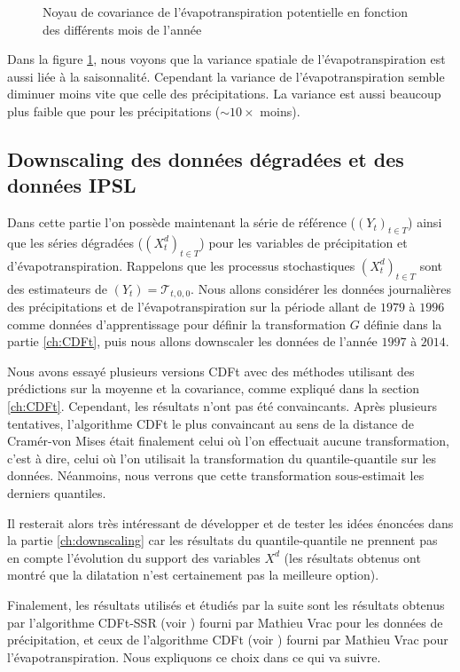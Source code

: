 \documentclass[a4paper,11pt]{article}
\numberwithin{equation}{section}
\begin{document}
\begin{figure}[H]
\begin{tabular}{ccc}
\end{tabular} 
	\caption{Noyau de covariance de l'évapotranspiration potentielle en fonction des différents mois de l'année}
	\label{fig-kernel-evap}
\end{figure}

Dans la figure \ref{fig-kernel-evap}, nous voyons que la variance spatiale de l'évapotranspiration est aussi liée à la saisonnalité. Cependant la variance de l'évapotranspiration semble diminuer moins vite que celle des précipitations. La variance est aussi beaucoup plus faible que pour les précipitations ($\sim 10 \times$ moins). 

\subsection{Downscaling des données dégradées et des données IPSL}
\label{ch:downscaling des donnees}

Dans cette partie l'on possède maintenant la série de référence ($(Y_t)_{t \in T}$) ainsi que les séries dégradées ($(X^d_t)_{t\in T}$) pour les variables de précipitation et d'évapotranspiration. Rappelons que les processus stochastiques $(X^d_t)_{t\in T}$ sont des estimateurs de $(Y_t)=\mathcal{T}_{t,0,0}$. Nous allons considérer les données journalières des précipitations et de l'évapotranspiration sur la période allant de $1979$ à $1996$ comme données d'apprentissage pour définir la transformation $G$ définie dans la partie \ref{ch:CDFt}, puis nous allons downscaler les données de l'année $1997$ à $2014$.

Nous avons essayé plusieurs versions CDFt avec des méthodes utilisant des prédictions sur la moyenne et la covariance, comme expliqué dans la section \ref{ch:CDFt}. Cependant, les résultats n'ont pas été convaincants. Après plusieurs tentatives, l'algorithme CDFt le plus convaincant au sens de la distance de Cramér-von Mises était finalement celui où l'on effectuait aucune transformation, c'est à dire, celui où l'on utilisait la transformation du quantile-quantile sur les données. Néanmoins, nous verrons que cette transformation sous-estimait les derniers quantiles.

Il resterait alors très intéressant de développer et de tester les idées énoncées dans la partie \ref{ch:downscaling} car les résultats du quantile-quantile ne prennent pas en compte l'évolution du support des variables $X^d$ (les résultats obtenus ont montré que la dilatation n'est certainement pas la meilleure option).

Finalement, les résultats utilisés et étudiés par la suite sont les résultats obtenus par l'algorithme CDFt-SSR (voir \cite{vrac2016bias}) fourni par Mathieu Vrac pour les données de précipitation, et ceux de l'algorithme CDFt (voir \cite{vrac2012dynamical}) fourni par Mathieu Vrac pour l'évapotranspiration. Nous expliquons ce choix dans ce qui va suivre.
\end{document}
